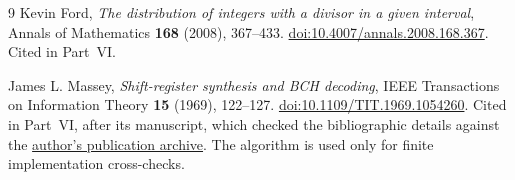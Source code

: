 \documentclass[11pt,a4paper]{article}
\numberwithin{equation}{section}
\theoremstyle{definition}
\theoremstyle{remark}
\begin{document}
\begin{thebibliography}{9}
Kevin Ford,
\emph{The distribution of integers with a divisor in a given interval},
Annals of Mathematics \textbf{168} (2008), 367--433.
\href{https://doi.org/10.4007/annals.2008.168.367}{doi:10.4007/annals.2008.168.367}.
Cited in Part~VI.

James L. Massey,
\emph{Shift-register synthesis and BCH decoding},
IEEE Transactions on Information Theory \textbf{15} (1969), 122--127.
\href{https://doi.org/10.1109/TIT.1969.1054260}{doi:10.1109/TIT.1969.1054260}.
Cited in Part~VI, after its manuscript, which checked the bibliographic
details against the
\href{https://www.isiweb.ee.ethz.ch/archive/massey_pub/dir/pdf.html}{author's publication archive}.
The algorithm is used only for finite implementation cross-checks.
\end{thebibliography}
\end{document}

